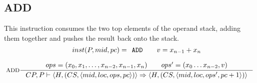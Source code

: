 \subsection{ADD}
This instruction consumes the two top elements of the operand stack, adding them together and pushes the result back onto the stack.
$$\inference[ADD]{ 
inst(P, mid, pc) = \texttt{ADD} \semsp
v = x_{n-1} + x_n \semnl \\
ops = (x_0,x_1, \ldots,x_{n-2},x_{n-1},x_n)\semsp
ops' = (x_0 \ldots x_{n-2},v)
}
{CP, P \vdash \langle H, (CS, \langle mid, loc, ops, pc \rangle)\rangle \Rightarrow 
 \langle H, (CS, \langle mid, loc, ops', pc + 1 \rangle)\rangle 
}$$

